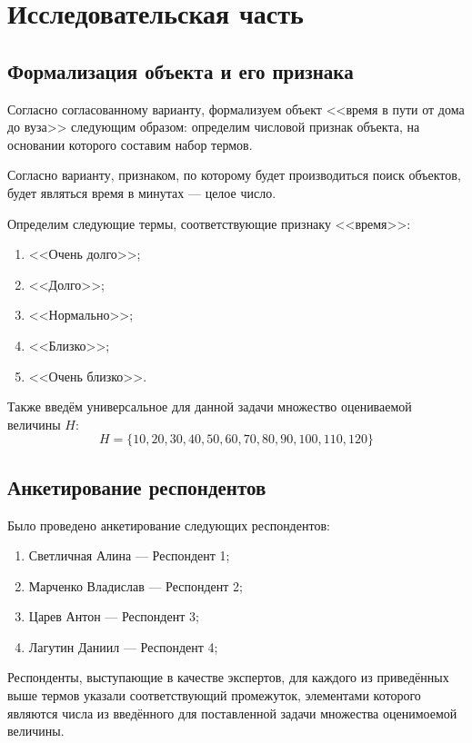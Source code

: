 \chapter{Исследовательская часть}

\section{Формализация объекта и его признака}
\label{formal}
Согласно согласованному варианту, формализуем объект <<время в пути от дома до вуза>> следующим образом: определим числовой признак объекта, на основании которого составим набор термов.

Согласно варианту, признаком, по которому будет производиться поиск объектов, будет являться время в минутах --- целое число.

Определим следующие термы, соответствующие признаку <<время>>:
\begin{enumerate}[label=\arabic*), itemindent=1em]
	\item <<Очень долго>>;
	\item <<Долго>>;
	\item <<Нормально>>;
	\item <<Близко>>;
	\item <<Очень близко>>.
\end{enumerate}

Также введём универсальное для данной задачи множество оцениваемой величины $H$:
\begin{equation}
	\label{eq:h}
	H = \{10, 20, 30, 40, 50,60,70,80,90,100,110,120\}
\end{equation}
\newpage
\section{Анкетирование респондентов}

Было проведено анкетирование следующих респондентов:
\begin{enumerate}[label=\arabic*), itemindent=1em]
	\item Светличная Алина --- Респондент 1;
	\item Марченко Владислав --- Респондент 2;
	\item Царев Антон --- Респондент 3;
	\item Лагутин Даниил --- Респондент 4;
\end{enumerate}

Респонденты, выступающие в качестве экспертов, для каждого из приведённых выше термов указали соответствующий промежуток, элементами которого являются числа из введённого для поставленной задачи множества оценимоемой величины.

